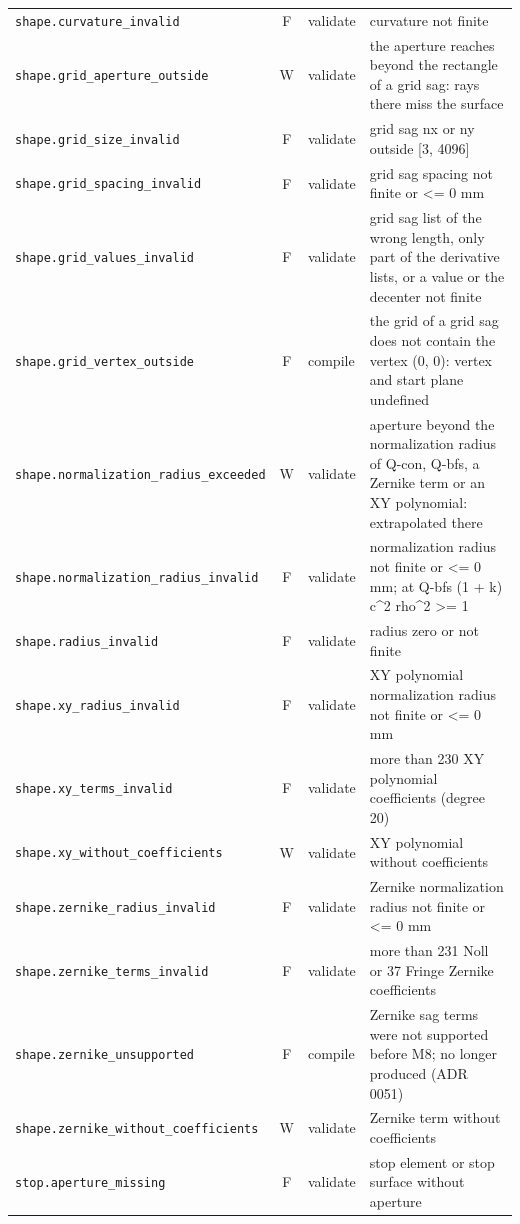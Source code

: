 \documentclass[11pt,a4paper,openany]{book}
\begin{document}
{\begin{longtable}{@{}L{6.1cm}cL{1.3cm}L{6.9cm}@{}}
\texttt{shape.curvature\_invalid} & F & validate & curvature not finite \\
\texttt{shape.grid\_aperture\_outside} & W & validate & the aperture reaches beyond the rectangle of a grid sag: rays there miss the surface \\
\texttt{shape.grid\_size\_invalid} & F & validate & grid sag nx or ny outside [3, 4096] \\
\texttt{shape.grid\_spacing\_invalid} & F & validate & grid sag spacing not finite or <= 0 mm \\
\texttt{shape.grid\_values\_invalid} & F & validate & grid sag list of the wrong length, only part of the derivative lists, or a value or the decenter not finite \\
\texttt{shape.grid\_vertex\_outside} & F & compile & the grid of a grid sag does not contain the vertex (0, 0): vertex and start plane undefined \\
\texttt{shape.normalization\_radius\_exceeded} & W & validate & aperture beyond the normalization radius of Q-con, Q-bfs, a Zernike term or an XY polynomial: extrapolated there \\
\texttt{shape.normalization\_radius\_invalid} & F & validate & normalization radius not finite or <= 0 mm; at Q-bfs (1 + k) c\textasciicircum{}2 rho\textasciicircum{}2 >= 1 \\
\texttt{shape.radius\_invalid} & F & validate & radius zero or not finite \\
\texttt{shape.xy\_radius\_invalid} & F & validate & XY polynomial normalization radius not finite or <= 0 mm \\
\texttt{shape.xy\_terms\_invalid} & F & validate & more than 230 XY polynomial coefficients (degree 20) \\
\texttt{shape.xy\_without\_coefficients} & W & validate & XY polynomial without coefficients \\
\texttt{shape.zernike\_radius\_invalid} & F & validate & Zernike normalization radius not finite or <= 0 mm \\
\texttt{shape.zernike\_terms\_invalid} & F & validate & more than 231 Noll or 37 Fringe Zernike coefficients \\
\texttt{shape.zernike\_unsupported} & F & compile & Zernike sag terms were not supported before M8; no longer produced (ADR 0051) \\
\texttt{shape.zernike\_without\_coefficients} & W & validate & Zernike term without coefficients \\
\texttt{stop.aperture\_missing} & F & validate & stop element or stop surface without aperture \\

\end{longtable}}
\end{document}
